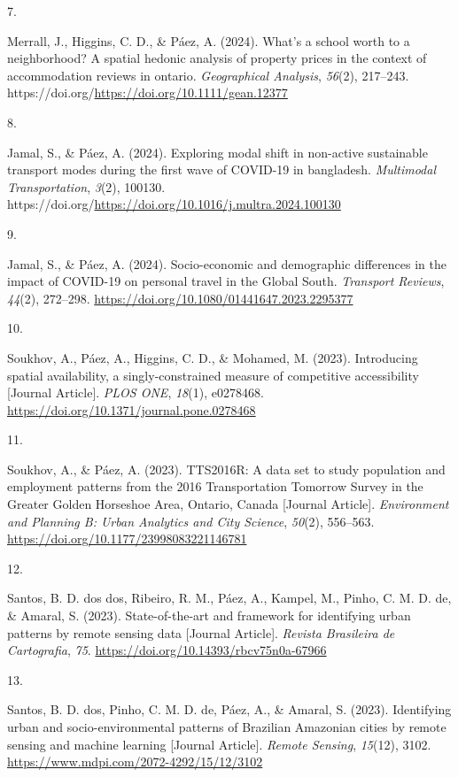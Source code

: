 \documentclass[11pt,a4paper,]{awesome-cv}
\newlength{\cslhangindent}
\newlength{\csllabelwidth}
\newenvironment{CSLReferences}[2] %
 {\begin{list}{}{%
  \setlength{\itemindent}{0pt}
  \setlength{\leftmargin}{0pt}
  \setlength{\parsep}{0pt}
  \ifodd #1
   \setlength{\leftmargin}{\cslhangindent}
   \setlength{\itemindent}{-1\cslhangindent}
  \fi
  \setlength{\itemsep}{#2\baselineskip}}}
 {\end{list}}
\newcommand{\CSLLeftMargin}[1]{\parbox[t]{\csllabelwidth}{\strut#1\strut}}
\newcommand{\CSLRightInline}[1]{\parbox[t]{\linewidth - \csllabelwidth}{\strut#1\strut}}
\begin{document}
\begin{CSLReferences}{0}{0}
\CSLLeftMargin{7. }%
\CSLRightInline{Merrall, J., Higgins, C. D., \& Páez, A. (2024). What's
a school worth to a neighborhood? A spatial hedonic analysis of property
prices in the context of accommodation reviews in ontario.
\emph{Geographical Analysis}, \emph{56}(2), 217--243.
https://doi.org/\url{https://doi.org/10.1111/gean.12377}}

\CSLLeftMargin{8. }%
\CSLRightInline{Jamal, S., \& Páez, A. (2024). Exploring modal shift in
non-active sustainable transport modes during the first wave of COVID-19
in bangladesh. \emph{Multimodal Transportation}, \emph{3}(2), 100130.
https://doi.org/\url{https://doi.org/10.1016/j.multra.2024.100130}}

\CSLLeftMargin{9. }%
\CSLRightInline{Jamal, S., \& Páez, A. (2024). Socio-economic and
demographic differences in the impact of COVID-19 on personal travel in
the Global South. \emph{Transport Reviews}, \emph{44}(2), 272--298.
\url{https://doi.org/10.1080/01441647.2023.2295377}}

\CSLLeftMargin{10. }%
\CSLRightInline{Soukhov, A., Páez, A., Higgins, C. D., \& Mohamed, M.
(2023). Introducing spatial availability, a singly-constrained measure
of competitive accessibility {[}Journal Article{]}. \emph{PLOS ONE},
\emph{18}(1), e0278468.
\url{https://doi.org/10.1371/journal.pone.0278468}}

\CSLLeftMargin{11. }%
\CSLRightInline{Soukhov, A., \& Páez, A. (2023). TTS2016R: A data set to
study population and employment patterns from the 2016 Transportation
Tomorrow Survey in the Greater Golden Horseshoe Area, Ontario, Canada
{[}Journal Article{]}. \emph{Environment and Planning B: Urban Analytics
and City Science}, \emph{50}(2), 556--563.
\url{https://doi.org/10.1177/23998083221146781}}

\CSLLeftMargin{12. }%
\CSLRightInline{Santos, B. D. dos dos, Ribeiro, R. M., Páez, A., Kampel,
M., Pinho, C. M. D. de, \& Amaral, S. (2023). State-of-the-art and
framework for identifying urban patterns by remote sensing data
{[}Journal Article{]}. \emph{Revista Brasileira de Cartografia},
\emph{75}. \url{https://doi.org/10.14393/rbcv75n0a-67966}}

\CSLLeftMargin{13. }%
\CSLRightInline{Santos, B. D. dos, Pinho, C. M. D. de, Páez, A., \&
Amaral, S. (2023). Identifying urban and socio-environmental patterns of
Brazilian Amazonian cities by remote sensing and machine learning
{[}Journal Article{]}. \emph{Remote Sensing}, \emph{15}(12), 3102.
\url{https://www.mdpi.com/2072-4292/15/12/3102}}


\end{CSLReferences}
\end{document}
